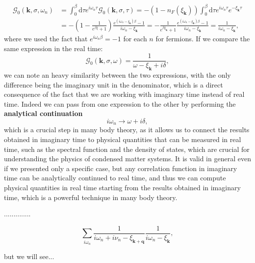 \[
    \begin{aligned}
        \mathcal{G}_0(\mathbf{k}, \sigma, \omega_n) & = \int_0^{\beta} \mathrm{d} \tau e^{i \omega_n \tau} \mathcal{G}_0(\mathbf{k}, \sigma, \tau) = - (1 - n_F(\xi_{\mathbf{k}})) \int_0^{\beta} \mathrm{d} \tau e^{i \omega_n \tau} e^{-\xi_{\mathbf{k}} \tau}                                                                                             \\
                                                    & = - (1 - \frac{1}{e^{\beta \xi} + 1}) \frac{e^{(i \omega_n - \xi_{\mathbf{k}}) \beta} - 1}{i \omega_n - \xi_{\mathbf{k}}} = - \frac{1}{e^{\beta \xi_{\mathbf{k}} } + 1} \frac{e^{(i \omega_n - \xi_{\mathbf{k}}) \beta} - 1}{i \omega_n - \xi_{\mathbf{k}}} = \frac{1}{i \omega_n - \xi_{\mathbf{k}}},
    \end{aligned}
\]
where we used the fact that \(e^{i \omega_n \beta} = -1\) for each \(n\) for fermions. If we compare the same expression in the real time:
\[
    \mathcal{G}_0(\mathbf{k}, \sigma, \omega) = \frac{1}{\omega - \xi_{\mathbf{k}} + i \delta},
\]
we can note an heavy similarity between the two expressions, with the only difference being the imaginary unit in the denominator, which is a direct consequence of the fact that we are working with imaginary time instead of real time. Indeed we can pass from one expression to the other by performing the \textbf{analytical continuation}
\[
    i \omega_n \to \omega + i \delta,
\]
which is a crucial step in many body theory, as it allows us to connect the results obtained in imaginary time to physical quantities that can be measured in real time, such as the spectral function and the density of states, which are crucial for understanding the physics of condensed matter systems. It is valid in general even if we presented only a specific case, but any correlation function in imaginary time can be analytically continued to real time, and thus we can compute physical quantities in real time starting from the results obtained in imaginary time, which is a powerful technique in many body theory.

\begin{example}
    ..............

    \[
        \sum_{i \omega_n} \frac{1}{i \omega_n + i \nu_n - \xi_{\mathbf{k} + \mathbf{q}}} \frac{1}{i \omega_n - \xi_{\mathbf{k}}},
    \]

    but we will see...
\end{example}